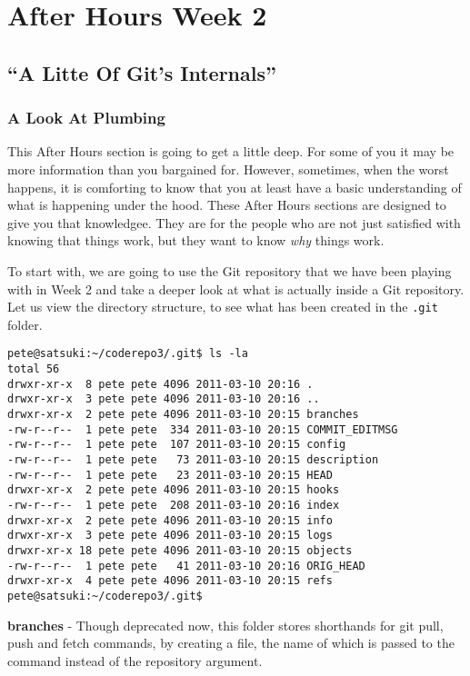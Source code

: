\chapter{After Hours Week 2}
\section{``A Litte Of Git's Internals''}
\subsection{A Look At Plumbing}

This After Hours section is going to get a little deep.  For some of you it may be more information than you bargained for.  However, sometimes, when the worst happens, it is comforting to know that you at least have a basic understanding of what is happening under the hood.  These After Hours sections are designed to give you that knowledgee.  They are for the people who are not just satisfied with knowing that things work, but they want to know \emph{why} things work.

To start with, we are going to use the Git repository that we have been playing with in Week 2 and take a deeper look at what is actually inside a Git repository.  Let us view the directory structure, to see what has been created in the \texttt{.git} folder.

\begin{Verbatim}[frame=leftline,framerule=1mm,fontsize=\relsize{-3}] 
pete@satsuki:~/coderepo3/.git$ ls -la
total 56
drwxr-xr-x  8 pete pete 4096 2011-03-10 20:16 .
drwxr-xr-x  3 pete pete 4096 2011-03-10 20:16 ..
drwxr-xr-x  2 pete pete 4096 2011-03-10 20:15 branches
-rw-r--r--  1 pete pete  334 2011-03-10 20:15 COMMIT_EDITMSG
-rw-r--r--  1 pete pete  107 2011-03-10 20:15 config
-rw-r--r--  1 pete pete   73 2011-03-10 20:15 description
-rw-r--r--  1 pete pete   23 2011-03-10 20:15 HEAD
drwxr-xr-x  2 pete pete 4096 2011-03-10 20:15 hooks
-rw-r--r--  1 pete pete  208 2011-03-10 20:16 index
drwxr-xr-x  2 pete pete 4096 2011-03-10 20:15 info
drwxr-xr-x  3 pete pete 4096 2011-03-10 20:15 logs
drwxr-xr-x 18 pete pete 4096 2011-03-10 20:15 objects
-rw-r--r--  1 pete pete   41 2011-03-10 20:16 ORIG_HEAD
drwxr-xr-x  4 pete pete 4096 2011-03-10 20:15 refs
pete@satsuki:~/coderepo3/.git$ 

\end{Verbatim} 

\textbf{branches} - Though deprecated now, this folder stores shorthands for git pull, push and fetch commands, by creating a file, the name of which is passed to the command instead of the repository argument.

